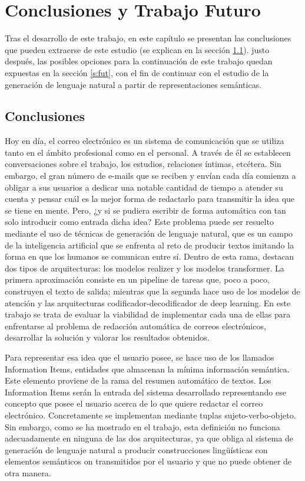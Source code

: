 \chapter{Conclusiones y Trabajo Futuro}
\label{cap:conclusiones}


Tras el desarrollo de este trabajo, en este capítulo se presentan las conclusiones que pueden extraerse de este estudio (se explican en la sección \ref{s:concl}). justo después, las posibles opciones para la continuación de este trabajo quedan expuestas en la sección \ref{s:fut}, con el fin de continuar con el estudio de la generación de lenguaje natural a partir de representaciones semánticas.

\section{Conclusiones}\label{s:concl}

Hoy en día, el correo electrónico es un sistema de comunicación que se utiliza tanto en el ámbito profesional como en el personal. A través de él se establecen conversaciones sobre el trabajo, los estudios, relaciones íntimas, etcétera. Sin embargo, el gran número de e-mails que se reciben y envían cada día comienza a obligar a sus usuarios a dedicar una notable cantidad de tiempo a atender su cuenta y pensar cuál es la mejor forma de redactarlo para transmitir la idea que se tiene en mente. Pero, ¿y si se pudiera escribir de forma automática con tan solo introducir como entrada dicha idea? Este problema puede ser resuelto mediante el uso de técnicas de generación de lenguaje natural, que es un campo de la inteligencia artificial que se enfrenta al reto de producir textos imitando la forma en que los humanos se comunican entre sí. Dentro de esta rama, destacan dos tipos de arquitecturas: los modelos realizer y los modelos transformer. La primera aproximación consiste en un pipeline de tareas que, poco a poco, construyen el texto de salida; mientras que la segunda hace uso de los modelos de atención y las arquitecturas codificador-decodificador de deep learning. En este trabajo se trata de evaluar la viabilidad de implementar cada una de ellas para enfrentarse al problema de redacción automática de correos electrónicos, desarrollar la solución y valorar los resultados obtenidos.

Para representar esa idea que el usuario posee, se hace uso de los llamados Information Items, entidades que almacenan la mínima información semántica. Este elemento proviene de la rama del resumen automático de textos. Los Information Items serán la entrada del sistema desarrollado representando ese concepto que posee el usuario acerca de lo que quiere redactar el correo electrónico. Concretamente se implementan mediante tuplas sujeto-verbo-objeto. Sin embargo, como se ha mostrado en el trabajo, esta definición no funciona adecuadamente en ninguna de las dos arquitecturas, ya que obliga al sistema de generación de lenguaje natural a producir construcciones lingüísticas con elementos semánticos on transmitidos por el usuario y que no puede obtener de otra manera.


